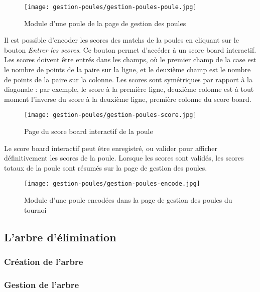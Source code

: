 \begin{figure}[H]
\centering
\texttt{[image: gestion-poules/gestion-poules-poule.jpg]}
\caption{Module d'une poule de la page de gestion des poules}
\end{figure}

Il est possible d'encoder les scores des matchs de la poules en cliquant sur le bouton \textit{Entrer les scores}. Ce bouton permet d'accéder à un score board interactif. Les scores doivent être entrés dans les champs, où le premier champ de la case est le nombre de points de la paire sur la ligne, et le deuxième champ est le nombre de points de la paire sur la colonne. Les scores sont symétriques par rapport à la diagonale : par exemple, le score à la première ligne, deuxième colonne est à tout moment l'inverse du score à la deuxième ligne, première colonne du score board.

\begin{figure}[H]
\centering
\texttt{[image: gestion-poules/gestion-poules-score.jpg]}
\caption{Page du score board interactif de la poule}
\end{figure}

Le score board interactif peut être enregistré, ou valider pour afficher définitivement les scores de la poule. Lorsque les scores sont validés, les scores totaux de la poule sont résumés sur la page de gestion des poules.

\begin{figure}[H]
\centering
\texttt{[image: gestion-poules/gestion-poules-encode.jpg]}
\caption{Module d'une poule encodées dans la page de gestion des poules du tournoi}
\end{figure}

\subsection{L'arbre d'élimination}

\subsubsection{Création de l'arbre}

\subsubsection{Gestion de l'arbre}